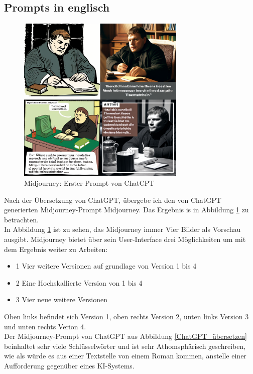 \subsection{Prompts in englisch}
\begin{figure}[h]
	\centering
	\includegraphics[width=8.022cm]{BilderFuerBA/MLaufEnglisch.png}
	\caption{Midjourney: Erster Prompt von ChatCPT}
	\label{Midjourney_erster_Prompt}
\end{figure}
Nach der Übersetzung von ChatGPT, übergebe ich den von ChatGPT generierten Midjourney-Prompt Midjourney. Das Ergebnis is in Abbildung \ref{Midjourney_erster_Prompt} zu betrachten.
\\
In Abbildung \ref{Midjourney_erster_Prompt} ist zu sehen, das Midjourney immer Vier Bilder als Vorschau ausgibt. Midjourney bietet über sein User-Interface drei Möglichkeiten um mit dem Ergebnis weiter zu Arbeiten:
\begin{itemize}
	\item 1 Vier weitere Versionen auf grundlage von Version 1 bis 4
	\item 2 Eine Hochskallierte Version von 1 bis 4
	\item 3 Vier neue weitere Versionen
\end{itemize}
Oben links befindet sich Version 1, oben rechts Version 2, unten links Version 3 und unten rechts Verion 4.
\\
Der Midjourney-Prompt von ChatGPT aus Abbildung \ref{ChatGPT_übersetzen} beinhaltet sehr viele Schlüsselwörter und ist sehr Athomsphärisch geschreiben, wie als würde es aus einer Textstelle von einem Roman kommen, anstelle einer Aufforderung gegenüber eines KI-Systems.
